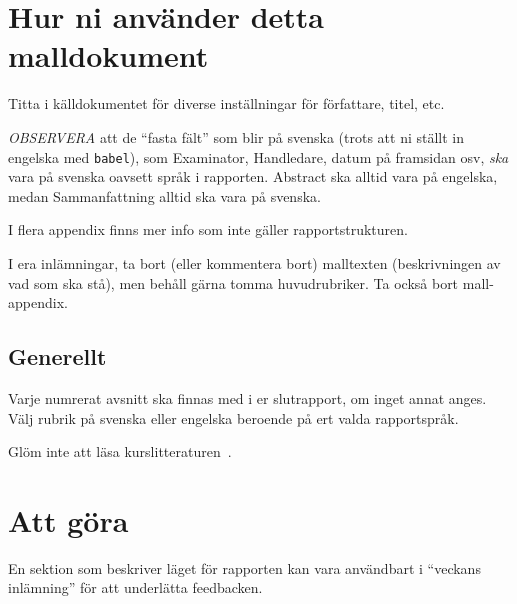 \documentclass[a4paper,12pt]{article}
\begin{document}

\section*{Hur ni använder detta malldokument}
Titta i källdokumentet för diverse inställningar för författare, titel, etc.

\emph{OBSERVERA} att de ``fasta fält'' som blir på svenska (trots att ni ställt in engelska med \texttt{babel}), som Examinator, Handledare, datum på framsidan osv, \emph{ska} vara på svenska oavsett språk i rapporten. Abstract ska alltid vara på engelska, medan Sammanfattning alltid ska vara på svenska.

I flera appendix finns mer info som inte gäller rapportstrukturen.

I era inlämningar, ta bort (eller kommentera bort) malltexten (beskrivningen av vad som ska stå), men behåll gärna tomma huvudrubriker. Ta också bort mall-appendix.

\subsection*{Generellt}
Varje numrerat avsnitt ska finnas med i er slutrapport, om inget annat anges.  
Välj rubrik på svenska eller engelska beroende på ert valda rapportspråk.

Glöm inte att läsa kurslitteraturen~\cite{dawson:projects-in-computing,dawson:projects-in-computing-old}.




\section*{Att göra}
En sektion som beskriver läget för rapporten kan vara användbart i ``veckans inlämning'' för att underlätta feedbacken.

\newpage %
\end{document}
